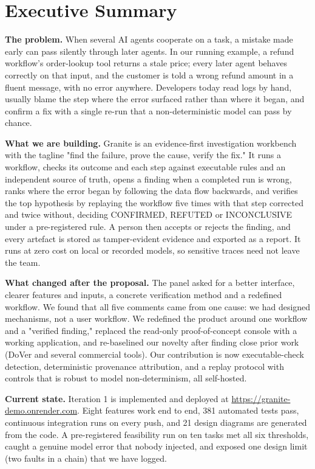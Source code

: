\chapter*{Executive Summary}
\sloppy%

\textbf{The problem.} When several AI agents cooperate on a task, a mistake made early can pass silently through later agents. In our running example, a refund workflow's order-lookup tool returns a stale price; every later agent behaves correctly on that input, and the customer is told a wrong refund amount in a fluent message, with no error anywhere. Developers today read logs by hand, usually blame the step where the error surfaced rather than where it began, and confirm a fix with a single re-run that a non-deterministic model can pass by chance.

\textbf{What we are building.} Granite is an evidence-first investigation workbench with the tagline "find the failure, prove the cause, verify the fix." It runs a workflow, checks its outcome and each step against executable rules and an independent source of truth, opens a finding when a completed run is wrong, ranks where the error began by following the data flow backwards, and verifies the top hypothesis by replaying the workflow five times with that step corrected and twice without, deciding CONFIRMED, REFUTED or INCONCLUSIVE under a pre-registered rule. A person then accepts or rejects the finding, and every artefact is stored as tamper-evident evidence and exported as a report. It runs at zero cost on local or recorded models, so sensitive traces need not leave the team.

\textbf{What changed after the proposal.} The panel asked for a better interface, clearer features and inputs, a concrete verification method and a redefined workflow. We found that all five comments came from one cause: we had designed mechanisms, not a user workflow. We redefined the product around one workflow and a "verified finding," replaced the read-only proof-of-concept console with a working application, and re-baselined our novelty after finding close prior work (DoVer and several commercial tools). Our contribution is now executable-check detection, deterministic provenance attribution, and a replay protocol with controls that is robust to model non-determinism, all self-hosted.

\textbf{Current state.} Iteration 1 is implemented and deployed at \url{https://granite-demo.onrender.com}. Eight features work end to end, 381 automated tests pass, continuous integration runs on every push, and 21 design diagrams are generated from the code. A pre-registered feasibility run on ten tasks met all six thresholds, caught a genuine model error that nobody injected, and exposed one design limit (two faults in a chain) that we have logged.

